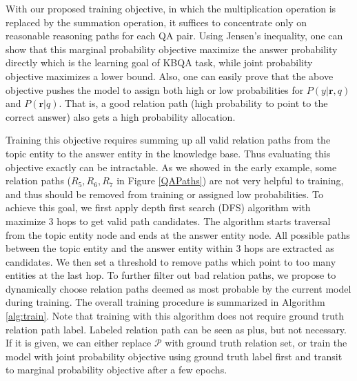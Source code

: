 With our proposed training objective, in which the multiplication operation is replaced by the summation operation, it suffices to concentrate only on reasonable reasoning paths for each QA pair. Using Jensen's inequality, one can show that this marginal probability objective maximize the answer probability directly which is the learning goal of KBQA task, while joint probability objective maximizes a lower bound. Also, one can easily prove that the above objective pushes the model to assign both high or low probabilities for $P(y|\mathbf{r},q)$ and $P(\mathbf{r}|q)$. That is, a good relation path (high probability to point to the correct answer) also gets a high probability allocation. %


Training this objective requires summing up all valid relation paths from the topic entity to the answer entity in the knowledge base. Thus evaluating this objective exactly can be intractable. As we showed in the early example, some relation paths ($R_5, R_6, R_7$ in Figure \ref{QAPaths}) are not very helpful to training, and thus should be removed from training or assigned low probabilities. To achieve this goal, we first apply depth first search (DFS) algorithm with maximize 3 hops to get valid path candidates. The algorithm starts traversal from the topic entity node and ends at the answer entity node. All possible paths between the topic entity and the answer entity within 3 hops are extracted as candidates. We then set a threshold to remove paths which point to too many entities at the last hop. To further filter out bad relation paths, we propose to dynamically choose relation paths deemed as most probable by the current model during training. The overall training procedure is summarized in Algorithm \ref{alg:train}. Note that training with this algorithm does not require ground truth relation path label. Labeled relation path can be seen as plus, but not necessary. If it is given, we can either replace $\mathcal{P}$ with ground truth relation set, or train the model with joint probability objective using ground truth label first and transit to marginal probability objective after a few epochs.

